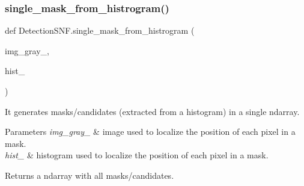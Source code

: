 \subsubsection{\texorpdfstring{single\+\_\+mask\+\_\+from\+\_\+histrogram()}{single\_mask\_from\_histrogram()}}
{\footnotesize\ttfamily def Detection\+S\+N\+F.\+single\+\_\+mask\+\_\+from\+\_\+histrogram (\begin{DoxyParamCaption}\item[{}]{img\+\_\+gray\+\_\+,  }\item[{}]{hist\+\_\+ }\end{DoxyParamCaption})}



It generates masks/candidates (extracted from a histogram) in a single ndarray. 


\begin{DoxyParams}{Parameters}
{\em img\+\_\+gray\+\_\+} & image used to localize the position of each pixel in a mask. \\
\hline
{\em hist\+\_\+} & histogram used to localize the position of each pixel in a mask. \\
\hline
\end{DoxyParams}
\begin{DoxyReturn}{Returns}
a ndarray with all masks/candidates. 
\end{DoxyReturn}
